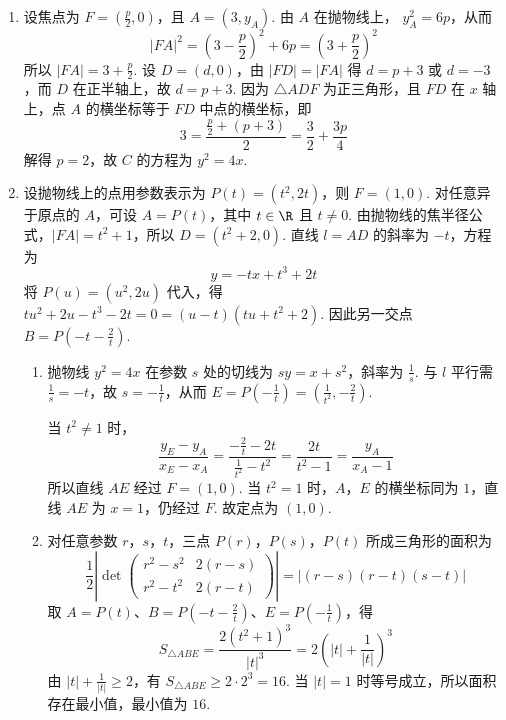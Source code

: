 \begin{solution}
\begin{enumerate}
\item 设焦点为 \(F=(\frac p2,0)\)，且 \(A=(3,y_A)\). 由 \(A\) 在抛物线上，
\(y_A^2=6p\)，从而
\[
|FA|^2=\left(3-\frac p2\right)^2+6p
=\left(3+\frac p2\right)^2
\]
所以 \(|FA|=3+\frac p2\). 设 \(D=(d,0)\)，由 \(|FD|=|FA|\) 得 \(d=p+3\) 或 \(d=-3\)，而 \(D\) 在正半轴上，故 \(d=p+3\). 因为 \(\triangle ADF\) 为正三角形，且 \(FD\) 在 \(x\) 轴上，点 \(A\) 的横坐标等于 \(FD\) 中点的横坐标，即
\[
3=\frac{\frac p2+(p+3)}2=\frac32+\frac{3p}{4}
\]
解得 \(p=2\)，故 \(C\) 的方程为 \(y^2=4x\).
\item 设抛物线上的点用参数表示为 \(P(t)=(t^2,2t)\)，则
\(F=(1,0)\). 对任意异于原点的 \(A\)，可设 \(A=P(t)\)，其中 \(t\in\R\) 且 \(t\ne0\). 由抛物线的焦半径公式，\(|FA|=t^2+1\)，所以
\(D=(t^2+2,0)\). 直线 \(l=AD\) 的斜率为 \(-t\)，方程为
\[
y=-tx+t^3+2t
\]
将 \(P(u)=(u^2,2u)\) 代入，得
\(tu^2+2u-t^3-2t=0=(u-t)(tu+t^2+2)\). 因此另一交点
\(B=P\left(-t-\frac2t\right)\).

\begin{enumerate}
\item 抛物线 \(y^2=4x\) 在参数 \(s\) 处的切线为 \(sy=x+s^2\)，斜率为 \(\frac{1}{s}\). 与 \(l\) 平行需 \(\frac{1}{s}=-t\)，故 \(s=-\frac{1}{t}\)，从而
\(E=P(-\frac{1}{t})=\left(\frac1{t^2},-\frac2t\right)\).

当 \(t^2\ne1\) 时，
\[
\frac{y_E-y_A}{x_E-x_A}
=\frac{-\frac{2}{t}-2t}{\frac{1}{t^2}-t^2}
=\frac{2t}{t^2-1}
=\frac{y_A}{x_A-1}
\]
所以直线 \(AE\) 经过 \(F=(1,0)\). 当 \(t^2=1\) 时，\(A\)，\(E\) 的横坐标同为 \(1\)，直线 \(AE\) 为 \(x=1\)，仍经过 \(F\). 故定点为 \((1,0)\).
\item 对任意参数 \(r\)，\(s\)，\(t\)，三点 \(P(r)\)，\(P(s)\)，\(P(t)\) 所成三角形的面积为
\[
\frac12\left|\det\begin{pmatrix}r^2-s^2&2(r-s)\\ r^2-t^2&2(r-t)\end{pmatrix}\right|
=|(r-s)(r-t)(s-t)|
\]
取 \(A=P(t)\)、\(B=P(-t-\frac{2}{t})\)、\(E=P(-\frac{1}{t})\)，得
\[
S_{\triangle ABE}
=\frac{2(t^2+1)^3}{|t|^3}
=2\left(|t|+\frac1{|t|}\right)^3
\]
由 \(|t|+\frac1{|t|}\geqslant2\)，有
\(S_{\triangle ABE}\geqslant2\cdot2^3=16\). 当 \(|t|=1\) 时等号成立，所以面积存在最小值，最小值为 \(16\).
\end{enumerate}
\end{enumerate}
\end{solution}

